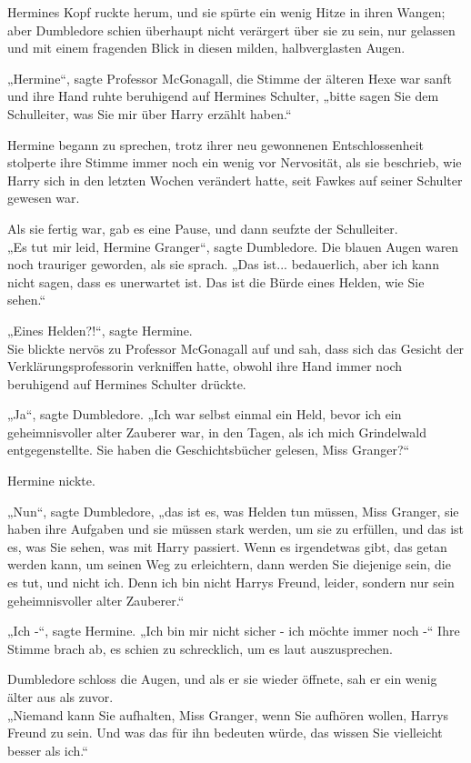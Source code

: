 {Hermines Kopf ruckte herum, und sie spürte ein wenig Hitze in ihren Wangen; aber Dumbledore schien überhaupt nicht verärgert über sie zu sein, nur gelassen und mit einem fragenden Blick in diesen milden, halbverglasten Augen.

„Hermine“, sagte Professor McGonagall, die Stimme der älteren Hexe war sanft und ihre Hand ruhte beruhigend auf Hermines Schulter, „bitte sagen Sie dem Schulleiter, was Sie mir über Harry erzählt haben.“

Hermine begann zu sprechen, trotz ihrer neu gewonnenen Entschlossenheit stolperte ihre Stimme immer noch ein wenig vor Nervosität, als sie beschrieb, wie Harry sich in den letzten Wochen verändert hatte, seit Fawkes auf seiner Schulter gewesen war.

Als sie fertig war, gab es eine Pause, und dann seufzte der Schulleiter.\\ „Es tut mir leid, Hermine Granger“, sagte Dumbledore. Die blauen Augen waren noch trauriger geworden, als sie sprach. „Das ist... bedauerlich, aber ich kann nicht sagen, dass es unerwartet ist. Das ist die Bürde eines Helden, wie Sie sehen.“

„Eines Helden?!“, sagte Hermine.\\ Sie blickte nervös zu Professor McGonagall auf und sah, dass sich das Gesicht der Verklärungsprofessorin verkniffen hatte, obwohl ihre Hand immer noch beruhigend auf Hermines Schulter drückte.

„Ja“, sagte Dumbledore. „Ich war selbst einmal ein Held, bevor ich ein geheimnisvoller alter Zauberer war, in den Tagen, als ich mich Grindelwald entgegenstellte. Sie haben die Geschichtsbücher gelesen, Miss Granger?“

Hermine nickte.

„Nun“, sagte Dumbledore, „das ist es, was Helden tun müssen, Miss Granger, sie haben ihre Aufgaben und sie müssen stark werden, um sie zu erfüllen, und das ist es, was Sie sehen, was mit Harry passiert. Wenn es irgendetwas gibt, das getan werden kann, um seinen Weg zu erleichtern, dann werden Sie diejenige sein, die es tut, und nicht ich. Denn ich bin nicht Harrys Freund, leider, sondern nur sein geheimnisvoller alter Zauberer.“

„Ich -“, sagte Hermine. „Ich bin mir nicht sicher - ich möchte immer noch -“ Ihre Stimme brach ab, es schien zu schrecklich, um es laut auszusprechen.

Dumbledore schloss die Augen, und als er sie wieder öffnete, sah er ein wenig älter aus als zuvor.\\ „Niemand kann Sie aufhalten, Miss Granger, wenn Sie aufhören wollen, Harrys Freund zu sein. Und was das für ihn bedeuten würde, das wissen Sie vielleicht besser als ich.“

}
